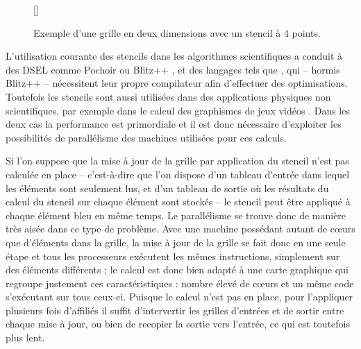 \begin{figure}[!h]
[\FBwidth]
{\caption{Exemple d'une grille en deux dimensions avec un stencil à 4 points.}\label{fig:stencil_base}}
{}
\end{figure}

L'utilisation courante des stencils dans les algorithmes scientifiques a conduit à des DSEL comme \textsf{Pochoir} \cite{Art18} ou  \textsf{Blitz++} \cite{Art5}, et des langages tels que \cite{Art19}, qui -- hormis \textsf{Blitz++} -- nécessitent leur propre compilateur afin d'effectuer des optimisations. Toutefois les stencils sont aussi utilisées dans des applications physiques non scientifiques, par exemple dans le calcul des graphismes de jeux vidéos \cite{Art15}. Dans les deux cas la performance est primordiale et il est donc nécessaire d'exploiter les possibilités de parallélisme des machines utilisées pour ces calculs.  

Si l'on suppose que la mise à jour de la grille par application du stencil n'est pas calculée en place -- c'est-à-dire que l'on dispose d'un tableau d'entrée dans lequel les éléments sont seulement lus, et d'un tableau de sortie où les résultats du calcul du stencil sur chaque élément sont stockés -- le stencil peut être appliqué à chaque élément bleu en même temps. Le parallélisme se trouve donc de manière très aisée dans ce type de problème. Avec une  machine possédant autant de cœurs que d'éléments dans la grille, la mise à jour de la grille se fait donc en une seule étape et tous les processeurs exécutent les mêmes instructions, simplement sur des éléments différents ; le calcul est donc bien adapté à une carte graphique qui regroupe justement ces caractéristiques : nombre élevé de cœurs et un même code s'exécutant sur tous ceux-ci. Puisque le calcul n'est pas en place, pour l'appliquer plusieurs fois d'affiliés il suffit d'intervertir les grilles d'entrées et de sortir entre chaque mise à jour, ou bien de recopier la sortie vers l'entrée, ce qui est toutefois plus lent.

